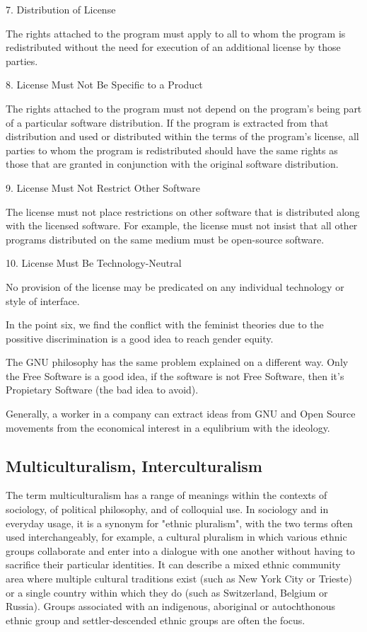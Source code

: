 \documentclass[fleqn,10pt,lineno]{wlpeerj} %
\begin{document}
7. Distribution of License

The rights attached to the program must apply to all to whom the
program is redistributed without the need for execution of an
additional license by those parties.

8. License Must Not Be Specific to a Product

The rights attached to the program must not depend on the program's
being part of a particular software distribution. If the program is
extracted from that distribution and used or distributed within the
terms of the program's license, all parties to whom the program is
redistributed should have the same rights as those that are granted in
conjunction with the original software distribution.

9. License Must Not Restrict Other Software

The license must not place restrictions on other software that is
distributed along with the licensed software. For example, the license
must not insist that all other programs distributed on the same medium
must be open-source software.

10. License Must Be Technology-Neutral

No provision of the license may be predicated on any individual
technology or style of interface.


In the point six, we find the conflict with the feminist theories due to
the possitive discrimination is a good idea to reach gender equity.

The GNU philosophy has the same problem explained on a different
way. Only the Free Software is a good idea, if the software is not Free
Software, then it's Propietary Software (the bad idea to avoid).

Generally, a worker in a company can extract ideas from GNU and Open
Source movements from the economical interest in a equlibrium with the
ideology.

\subsection*{Multiculturalism, Interculturalism}

The term multiculturalism has a range of meanings within the contexts
of sociology, of political philosophy, and of colloquial use. In
sociology and in everyday usage, it is a synonym for "ethnic
pluralism", with the two terms often used interchangeably, for
example, a cultural pluralism in which various ethnic groups
collaborate and enter into a dialogue with one another without having
to sacrifice their particular identities. It can describe a mixed
ethnic community area where multiple cultural traditions exist (such
as New York City or Trieste) or a single country within which they do
(such as Switzerland, Belgium or Russia). Groups associated with an
indigenous, aboriginal or autochthonous ethnic group and
settler-descended ethnic groups are often the focus.
\end{document}
